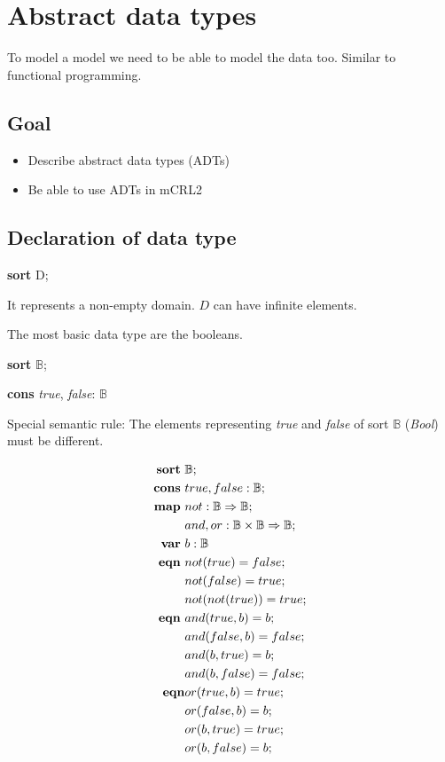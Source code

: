 
\section{Abstract data types}

To model a model we need to be able to model the data too. Similar to functional programming.

\subsection{Goal}
\begin{itemize}
  \item Describe abstract data types (ADTs)
  \item Be able to use ADTs in mCRL2
\end{itemize}

\subsection{Declaration of data type}

\textbf{sort} D;

It represents a non-empty domain. $D$ can have infinite elements.

The most basic data type are the booleans.

\textbf{sort} $\mathbb{B}$;

\textbf{cons} \emph{true}, \emph{false}: $\mathbb{B}$

Special semantic rule: The elements representing \emph{true} and \emph{false} of sort $\mathbb{B}$
(\emph{Bool}) must be different.

\begin{align*}
  \text{\textbf{sort} } & \mathbb{B}; \\
  \text{\textbf{cons} } & true, false: \mathbb{B}; \\
  \text{\textbf{map} } & not: \mathbb{B} \Rightarrow \mathbb{B}; \\
  & and, or: \mathbb{B} \times \mathbb{B} \Rightarrow \mathbb{B}; \\
  \text{\textbf{var} } & b: \mathbb{B} \\
  \text{\textbf{eqn} } & not(true) = false; \\
  & not(false) = true; \\
  & not(not(true)) = true; \\
  \text{\textbf{eqn} } & and(true, b) = b; \\
  & and(false, b) = false; \\
  & and(b, true) = b; \\
  & and(b, false) = false; \\
  \text{\textbf{eqn}} & or(true, b) = true; \\
  & or(false, b) = b; \\
  & or(b, true) = true; \\
  & or(b, false) = b; \\
\end{align*}

